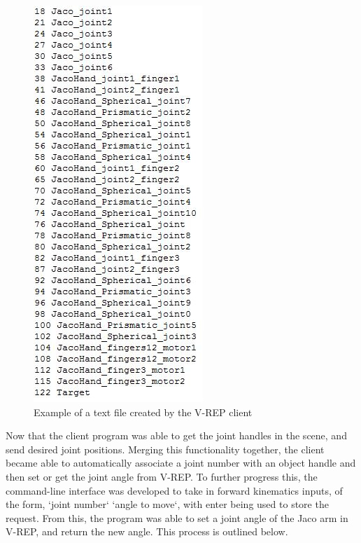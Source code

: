 \documentclass[12pt,openany,a4paper]{book}
\begin{document}
\vspace{\baselineskip}

\begin{center}
\begin{figure}[htb]
  \includegraphics[width=0.4\linewidth]{text_file_example.jpg}
\caption{Example of a text file created by the V-REP client}
\end{figure}
\end{center}

\vspace{\baselineskip}

Now that the client program was able to get the joint handles in the scene, and send desired joint positions. Merging this functionality together, the client became able to automatically associate a joint number with an object handle and then set or get the joint angle from V-REP. To further progress this, the command-line interface was developed to take in forward kinematics inputs, of the form, `joint number` `angle to move`, with enter being used to store the request. From this, the program was able to set a joint angle of the Jaco arm in V-REP, and return the new angle. This process is outlined below.

\vspace{\baselineskip}
\end{document}
